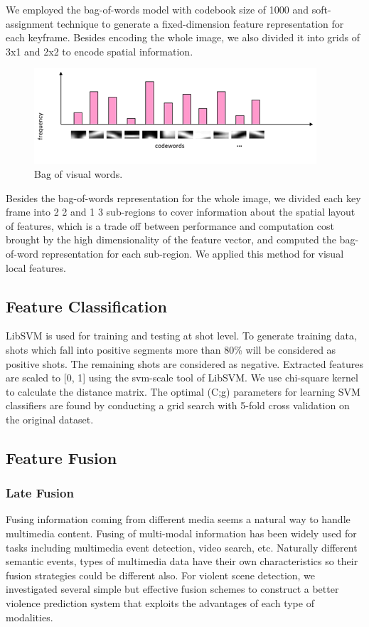 \documentclass[review]{elsarticle}
\begin{document}
We employed the bag-of-words model with codebook size of 1000 and soft-assignment technique to generate a fixed-dimension feature representation for each keyframe. Besides encoding the whole image, we also divided it into grids of 3x1 and 2x2 to encode spatial information.
\begin{figure}[!h]
	\centering
	\includegraphics[width=0.7\linewidth]{Images/Bow.png}
	\caption{Bag of visual words.}
	\label{fig:bow}
\end{figure}
Besides the bag-of-words representation for the whole image, we divided each key frame into 2  2 and 1  3 sub-regions to cover information about the spatial layout of features, which is a trade off between performance and computation cost brought by the high dimensionality of the feature vector, and computed the bag-of-word representation for each sub-region. We applied this method for visual local features.
\subsection{Feature Classification}

LibSVM \cite{LibSVM} is used for training and testing at shot level. To generate training data, shots which fall into positive segments more than 80\% will be considered as positive shots. The remaining shots are considered as negative. Extracted features are scaled to [0, 1] using the svm-scale tool of LibSVM. We use chi-square kernel to calculate the distance matrix. The optimal (C;g) parameters for learning SVM classifiers are found by conducting a grid search with 5-fold cross validation on the original dataset.

\subsection{Feature Fusion}
\subsubsection{Late Fusion}
Fusing information coming from different media seems a natural way to handle multimedia content. Fusing of multi-modal information has been widely used for tasks including multimedia event detection, video search, etc. Naturally different semantic events, types of multimedia data have their own characteristics so their fusion strategies could be different also. For violent scene detection, we investigated several simple but effective fusion schemes to construct a better violence prediction system that exploits the advantages of each type of modalities. 
\end{document}
